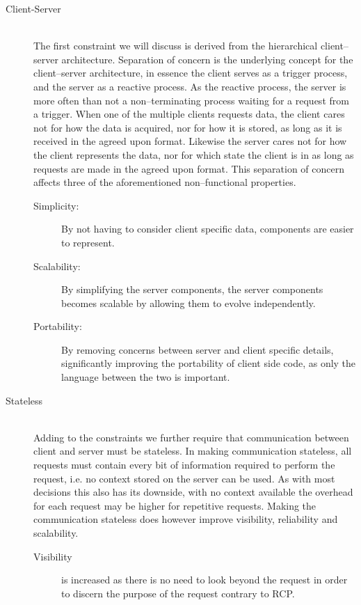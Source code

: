 \begin{description}
    \item [Client-Server\label{client-server-rest}] \hfill \\
    The first constraint we will discuss is derived from the hierarchical client--server architecture.
    Separation of concern is the underlying concept for the client--server architecture, in essence the client serves as a trigger process, and the server as a reactive process.
    As the reactive process, the server is more often than not a non--terminating process waiting for a request from a trigger.
    When one of the multiple clients requests data, the client cares not for how the data is acquired, nor for how it is stored, as long as it is received in the agreed upon format.
    Likewise the server cares not for how the client represents the data, nor for which state the client is in as long as requests are made in the agreed upon format.
    This separation of concern affects three of the aforementioned non--functional properties.
    \begin{description}
        \item[Simplicity:] By not having to consider client specific data, components are easier to represent.
        \item[Scalability:] By simplifying the server components, the server components becomes scalable by allowing them to evolve independently.
        \item[Portability:] By removing concerns between server and client specific details, significantly improving the portability of client side code, as only the language between the two is important.
    \end{description}
    \item [Stateless] \hfill \\
    Adding to the constraints we further require that communication between client and server must be stateless.
    In making communication stateless, all requests must contain every bit of information required to perform the request, i.e. no context stored on the server can be used.
    As with most decisions this also has its downside, with no context available the overhead for each request may be higher for repetitive requests.
    Making the communication stateless does however improve visibility, reliability and scalability.
    \begin{description}
        \item[Visibility] is increased as there is no need to look beyond the request in order to discern the purpose of the request contrary to RCP.

\end{description}
\end{description}
